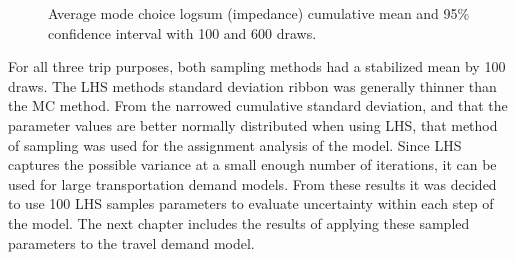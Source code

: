 \documentclass[
  letterpaper,
]{trb}
\begin{document}
\begin{figure}

\begin{minipage}[t]{0.50\linewidth}

{\centering 


}

\end{minipage}%
%
\begin{minipage}[t]{0.50\linewidth}

{\centering 


}

\end{minipage}%
\newline
\begin{minipage}[t]{0.50\linewidth}

{\centering 


}

\end{minipage}%

\caption{\label{fig-cm}Average mode choice logsum (impedance) cumulative
mean and 95\% confidence interval with 100 and 600 draws.}

\end{figure}

For all three trip purposes, both sampling methods had a stabilized mean
by 100 draws. The LHS methods standard deviation ribbon was generally
thinner than the MC method. From the narrowed cumulative standard
deviation, and that the parameter values are better normally distributed
when using LHS, that method of sampling was used for the assignment
analysis of the model. Since LHS captures the possible variance at a
small enough number of iterations, it can be used for large
transportation demand models. From these results it was decided to use
100 LHS samples parameters to evaluate uncertainty within each step of
the model. The next chapter includes the results of applying these
sampled parameters to the travel demand model.
\end{document}

